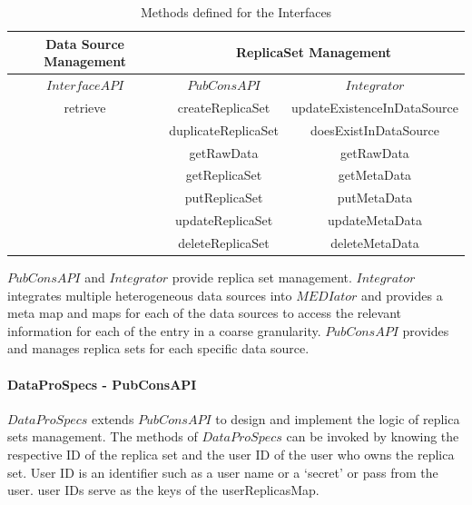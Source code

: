 \documentclass[conference]{IEEEtran}
\begin{document}
\begin{table}[!ht]
\centering
\caption{Methods defined for the Interfaces \vspace{-13pt}}
\label{table:interfaces}
\begin{tabular}{|c||c| |c|}

\toprule
\textbf{Data Source Management} & \multicolumn{2}{c}{\textbf{ReplicaSet Management}} \\
\midrule

\textbf{$InterfaceAPI$} & \textbf{$PubConsAPI$}&\textbf{$Integrator$} \\
\hline
retrieve & createReplicaSet&updateExistenceInDataSource \\
  & duplicateReplicaSet&doesExistInDataSource\\
  & getRawData&getRawData\\
 & getReplicaSet&getMetaData \\
 & putReplicaSet&putMetaData \\
 & updateReplicaSet&updateMetaData \\
 & deleteReplicaSet&deleteMetaData \\
\bottomrule
\end{tabular}
 \vspace{-13pt}
\end{table}

$PubConsAPI$ and $Integrator$ provide replica set management. $Integrator$ integrates multiple heterogeneous data sources into $MEDIator$ and provides a meta map and maps for each of the data sources to access the relevant information for each of the entry in a coarse granularity. $PubConsAPI$ provides and manages replica sets for each specific data source.  

\paragraph*{DataProSpecs - PubConsAPI}
$DataProSpecs$ extends $PubConsAPI$ to design and implement the logic of replica sets management. The methods of $DataProSpecs$ can be invoked by knowing the respective ID of the replica set and the user ID of the user who owns the replica set. User ID is an identifier such as a user name or a `secret' or pass from the user. user IDs serve as the keys of the userReplicasMap. 
\end{document}
